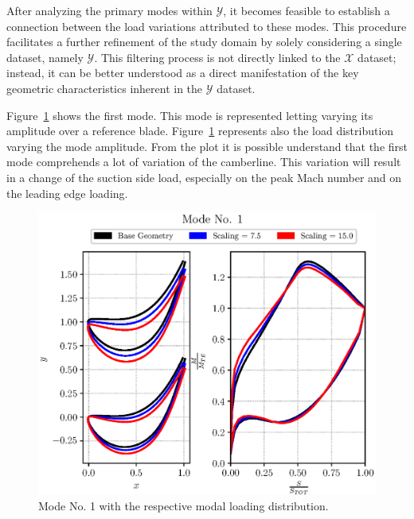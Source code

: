 After analyzing the primary modes within $\mathcal{Y}$, it becomes feasible to establish a connection between the load variations attributed to these modes. This procedure facilitates a further refinement of the study domain by solely considering a single dataset, namely $\mathcal{Y}$. This filtering process is not directly linked to the $\mathcal{X}$ dataset; instead, it can be better understood as a direct manifestation of the key geometric characteristics inherent in the $\mathcal{Y}$ dataset.

Figure~\ref{fig:PCAmode1} shows the first mode. This mode is represented 
letting varying its amplitude over a reference blade. Figure~\ref{fig:PCAmode1}
represents also the load distribution varying the mode amplitude. From the plot 
it is possible understand that the first mode comprehends a lot of variation of the camberline.
This variation will result in a change of the suction side load, especially on the peak 
Mach number and on the leading edge loading.

\begin{figure}[H]
    \centering
    \includegraphics[scale=\scaleBlade]{./images/mode01.eps}
    \caption{Mode No. 1 with the respective modal loading distribution.}
    \label{fig:PCAmode1}
\end{figure}

